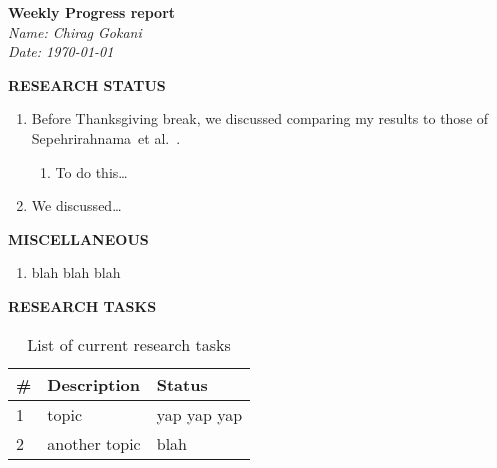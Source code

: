 \documentclass[12pt]{article}
\newcommand{\Sep}{Sepehrirahnama}
\begin{document}
\noindent\textbf{Weekly Progress report}\\
\textit{Name: Chirag Gokani\\Date: \today}\\
\vspace{12pt}

\noindent \textbf{RESEARCH STATUS}
\begin{enumerate}
\item Before Thanksgiving break, we discussed comparing my results to those of \Sep~et al.~\cite{sepehrirahnama2021acoustic}. 
\begin{enumerate}[label=(\alph*)]
\item To do this\dots 
\end{enumerate}
\item We discussed\dots
\end{enumerate}


\noindent \textbf{MISCELLANEOUS}
\begin{enumerate}
\item blah blah blah
\end{enumerate}


 
\noindent \textbf{RESEARCH TASKS}
\begin{table}[h]
\centering
\begin{tabular}{ l | l | l } 
\textbf{\#} & \textbf{Description} &  \textbf{Status} \\
\hline\hline
1 & topic & yap yap yap\\
2 & another topic & blah 
\end{tabular}
\caption{List of current research tasks}\label{variables}
\end{table}

\printbibliography[heading=bibintoc, title={References}]
\end{document}
